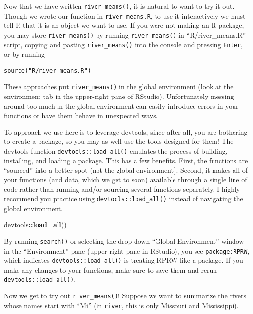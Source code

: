 \documentclass[
]{book}
\newenvironment{Shaded}{\begin{snugshade}}{\end{snugshade}}
\newcommand{\KeywordTok}[1]{\textcolor[rgb]{0.13,0.29,0.53}{\textbf{#1}}}
\newcommand{\NormalTok}[1]{#1}
\newcommand{\OperatorTok}[1]{\textcolor[rgb]{0.81,0.36,0.00}{\textbf{#1}}}
\begin{document}
Now that we have written \texttt{river\_means()}, it is natural to want to try it out. Though we wrote our function in \texttt{river\_means.R}, to use it interactively we must tell R that it is an object we want to use. If you were not making an R package, you may store \texttt{river\_means()} by running \texttt{river\_means()} in ``R/river\_means.R'' script, copying and pasting \texttt{river\_means()} into the console and pressing \texttt{Enter}, or by running

\begin{verbatim}
source("R/river_means.R")
\end{verbatim}

These approaches put \texttt{river\_means()} in the global environment (look at the environment tab in the upper-right pane of RStudio). Unfortunately messing around too much in the global environment can easily introduce errors in your functions or have them behave in unexpected ways.

To approach we use here is to leverage devtools, since after all, you are bothering to create a package, so you may as well use the tools designed for them! The devtools function \texttt{devtools::load\_all()} emulates the process of building, installing, and loading a package. This has a few benefits. First, the functions are ``sourced'' into a better spot (not the global environment). Second, it makes all of your functions (and data, which we get to soon) available through a single line of code rather than running and/or sourcing several functions separately. I highly recommend you practice using \texttt{devtools::load\_all()} instead of navigating the global environment.

\begin{Shaded}
\begin{Highlighting}[]
\NormalTok{devtools}\OperatorTok{::}\KeywordTok{load_all}\NormalTok{()}
\end{Highlighting}
\end{Shaded}

By running \texttt{search()} or selecting the drop-down ``Global Environment'' window in the ``Environment'' pane (upper-right pane in RStudio), you see \texttt{package:RPRW}, which indicates \texttt{devtools::load\_all()} is treating RPRW like a package. If you make any changes to your functions, make sure to save them and rerun \texttt{devtools::load\_all()}.

Now we get to try out \texttt{river\_means()}! Suppose we want to summarize the rivers whose names start with ``Mi'' (in \texttt{river}, this is only Missouri and Mississippi).
\end{document}
